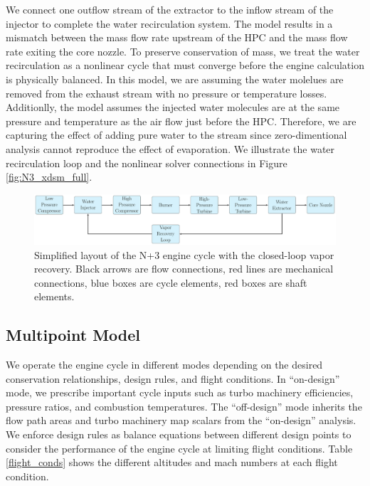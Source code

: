 \documentclass[conf]{new-aiaa}
\begin{document}
We connect one outflow stream of the extractor to the inflow stream of the injector to complete the water recirculation system.
The model results in a mismatch between the mass flow rate upstream of the HPC and the mass flow rate exiting the core nozzle.
To preserve conservation of mass, we treat the water recirculation as a nonlinear cycle that must converge before the engine calculation is physically balanced.
In this model, we are assuming the water molelues are removed from the exhaust stream with no pressure or temperature losses.
Additionlly, the model assumes the injected water molecules are at the same pressure and temperature as the air flow just before the HPC.
Therefore, we are capturing the effect of adding pure water to the stream since zero-dimentional analysis cannot reproduce the effect of evaporation.
We illustrate the water recirculation loop and the nonlinear solver connections in Figure \ref{fig:N3_xdsm_full}.

\begin{figure}[hbt!]
    \centering
    \includegraphics[width=1.0\textwidth]{N3_CLVR_cycle.pdf}
    \caption{
        Simplified layout of the N+3 engine cycle with the closed-loop vapor recovery.
        Black arrows are flow connections, red lines are mechanical connections, blue boxes are cycle elements, red boxes are shaft elements.
    }
    \label{fig:n3_clvr}
\end{figure}

\subsection{Multipoint Model}
We operate the engine cycle in different modes depending on the desired conservation relationships, design rules, and flight conditions.
In ``on-design'' mode, we prescribe important cycle inputs such as turbo machinery efficiencies, pressure ratios, and combustion temperatures.
The ``off-design'' mode inherits the flow path areas and turbo machinery map scalars from the ``on-design'' analysis.
We enforce design rules as balance equations between different design points to consider the performance of the engine cycle at limiting flight conditions.
Table \ref{flight_conds} shows the different altitudes and mach numbers at each flight condition.
\end{document}
